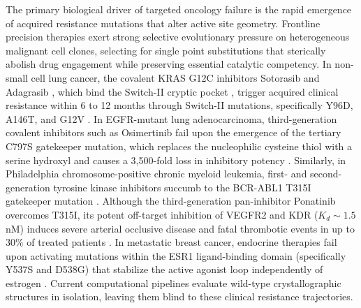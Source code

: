 \documentclass[11pt,a4paper]{article}
\begin{document}
The primary biological driver of targeted oncology failure is the rapid emergence of acquired resistance mutations that alter active site geometry. Frontline precision therapies exert strong selective evolutionary pressure on heterogeneous malignant cell clones, selecting for single point substitutions that sterically abolish drug engagement while preserving essential catalytic competency. In non-small cell lung cancer, the covalent KRAS G12C inhibitors Sotorasib \cite{canon2019clinical} and Adagrasib \cite{hallin2020kras}, which bind the Switch-II cryptic pocket \cite{ostrem2013kras}, trigger acquired clinical resistance within 6 to 12 months through Switch-II mutations, specifically Y96D, A146T, and G12V \cite{tanaka2021clinical,awad2021acquired}. In EGFR-mutant lung adenocarcinoma, third-generation covalent inhibitors such as Osimertinib \cite{janne2015azn9291} fail upon the emergence of the tertiary C797S gatekeeper mutation, which replaces the nucleophilic cysteine thiol with a serine hydroxyl and causes a 3,500-fold loss in inhibitory potency \cite{thress2015acquired,niederst2015mechanisms}. Similarly, in Philadelphia chromosome-positive chronic myeloid leukemia, first- and second-generation tyrosine kinase inhibitors succumb to the BCR-ABL1 T315I gatekeeper mutation \cite{shah2004overriding}. Although the third-generation pan-inhibitor Ponatinib overcomes T315I, its potent off-target inhibition of VEGFR2 and KDR ($K_d \sim 1.5$\,nM) induces severe arterial occlusive disease and fatal thrombotic events in up to 30\% of treated patients \cite{cortes2013safety,moslehi2015revisiting}. In metastatic breast cancer, endocrine therapies fail upon activating mutations within the ESR1 ligand-binding domain (specifically Y537S and D538G) that stabilize the active agonist loop independently of estrogen \cite{toy2013esr1,robinson2013activating}. Current computational pipelines evaluate wild-type crystallographic structures in isolation, leaving them blind to these clinical resistance trajectories.
\end{document}
